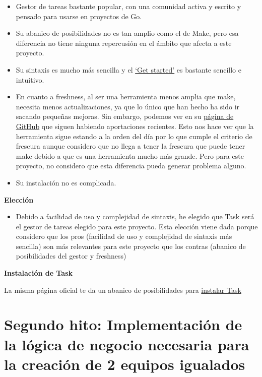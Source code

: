 \begin{itemize}
\item
  Gestor de tareas bastante popular, con una comunidad activa y escrito
  y pensado para usarse en proyectos de Go.
\item
  Su abanico de posibilidades no es tan amplio como el de Make, pero esa
  diferencia no tiene ninguna repercusión en el ámbito que afecta a este
  proyecto.
\item
  Su sintaxis es mucho más sencilla y el
  \href{https://taskfile.dev/usage/}{`Get started'} es bastante sencillo
  e intuitivo.
\item
  En cuanto a freshness, al ser una herramienta menos amplia que make,
  necesita menos actualizaciones, ya que lo único que han hecho ha sido
  ir sacando pequeñas mejoras. Sin embargo, podemos ver en su
  \href{https://github.com/go-task/task}{página de GitHub} que siguen
  habiendo aportaciones recientes. Esto nos hace ver que la herramienta
  sigue estando a la orden del día por lo que cumple el criterio de
  frescura aunque considero que no llega a tener la frescura que puede
  tener make debido a que es una herramienta mucho más grande. Pero para
  este proyecto, no considero que esta diferencia pueda generar problema
  alguno.
\item
  Su instalación no es complicada.
\end{itemize}


\textbf{Elección}

\begin{itemize}
\item
  Debido a facilidad de uso y complejidad de sintaxis, he elegido que
  Task será el gestor de tareas elegido para este proyecto. Esta
  elección viene dada porque considero que los pros (facilidad de uso y
  complejidad de sintaxis más sencilla) son más relevantes para este
  proyecto que los contras (abanico de posibilidades del gestor y
  freshness)
\end{itemize}

\textbf{Instalación de Task}

La misma página oficial te da un abanico de posibilidades para
\href{https://taskfile.dev/installation/}{instalar Task}

\newpage
\section{Segundo hito: Implementación de la lógica de negocio necesaria para la creación de 2 equipos igualados}

